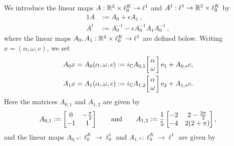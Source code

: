 \begin{definition}\label{def:A}
We introduce the linear maps $A:  \mathbb{R}^2 \times \ell^K_0 \to \ell^1$ and 
$ A^{\dagger}:  \ell^1 \to  \mathbb{R}^2 \times \ell^K_0 $ by
\begin{alignat*}{1}
A &:= A_0 + \epsilon A_1 \, , \\
A^{\dagger} &:= A_0^{-1} - \epsilon A_0^{-1} A_1 A_0^{-1} \,  ,
\end{alignat*}
where the linear maps $ A_0 , A_1 : \mathbb{R}^2 \times \ell^K_0 \to \ell^1$  are defined below. Writing $x=(\alpha,\omega,c)$, we set
\begin{alignat*}{1}
A_0	x = A_0 (\alpha,\omega,c) & := i_\C A_{0,1} 
\!\left[\!\! \begin{array}{c} \alpha \\ \omega \end{array} \!\!\right]  \e_1
 + A_{0,*}  c , \\
A_1 x =	A_1 (\alpha,\omega,c) & := i_\C  A_{1,2}
\!\left[\!\! \begin{array}{c} \alpha \\ \omega \end{array} \!\!\right]  \e_2
 + A_{1,*}  c .
\end{alignat*}
Here the matrices $A_{0,1}$ and $A_{1,2}$ are given by
\begin{equation}
A_{0,1} := 
\left[
\begin{matrix}
0 & - \tfrac{\pi}{2} \\
-1  & 1 
\end{matrix} 
\right]
\qquad\text{and}\qquad
A_{1,2} := \frac{1}{5}
\left[
\begin{matrix}
-2 & 2-\tfrac{3 \pi}{2} \\
-4  & 2(2+\pi) 
\end{matrix}  
\right]  ,
\label{eq:defA12}
\end{equation}
and the linear maps $A_{0,*} : \ell^K_0 \to \ell^1_0$ and
$A_{1,*} : \ell^K_0 \to \ell^1$
are given by
\begin{equation*}

\end{equation*}
\end{definition}
